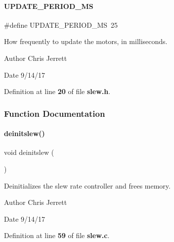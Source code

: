 \mbox{\label{a00065_a4e8e7d6fdd1f5c6f8a0f341e4b61f025}} 
\paragraph{U\+P\+D\+A\+T\+E\+\_\+\+P\+E\+R\+I\+O\+D\+\_\+\+MS}
{\footnotesize\ttfamily \#define U\+P\+D\+A\+T\+E\+\_\+\+P\+E\+R\+I\+O\+D\+\_\+\+MS~25}



How frequently to update the motors, in milliseconds. 

\begin{DoxyAuthor}{Author}
Chris Jerrett 
\end{DoxyAuthor}
\begin{DoxyDate}{Date}
9/14/17 
\end{DoxyDate}


Definition at line \textbf{ 20} of file \textbf{ slew.\+h}.



\subsubsection{Function Documentation}
\mbox{\label{a00065_a981c9990a969d2587e66e550737f7cd9}} 
\paragraph{deinitslew()}
{\footnotesize\ttfamily void deinitslew (\begin{DoxyParamCaption}{ }\end{DoxyParamCaption})}



Deinitializes the slew rate controller and frees memory. 

\begin{DoxyAuthor}{Author}
Chris Jerrett 
\end{DoxyAuthor}
\begin{DoxyDate}{Date}
9/14/17 
\end{DoxyDate}


Definition at line \textbf{ 59} of file \textbf{ slew.\+c}.



